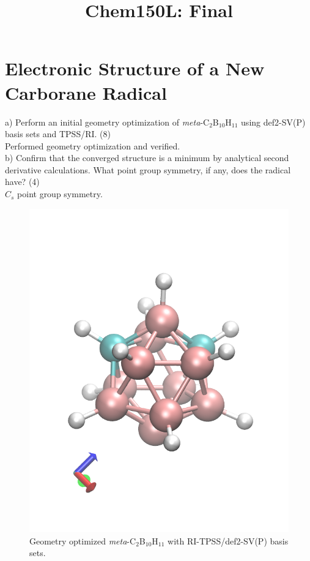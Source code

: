 \documentclass{article}
\title{Chem150L: Final} %
\begin{document}
\maketitle

\section*{Electronic Structure of a New Carborane Radical}

\noindent a) Perform an initial geometry optimization of \textit{meta}-C$_2$B$_{10}$H$_{11}$
using def2-SV(P) basis sets and TPSS/RI. (8)
\\

{\color{blue} Performed geometry optimization and verified.}
\\

\noindent b) Confirm that the converged structure is a minimum by analytical
second derivative calculations. What point group symmetry, if any, does the
radical have? (4)
\\

{\color{blue} $C_s$ point group symmetry.}

\begin{figure}[H]
  \centering
  \includegraphics[scale=0.25]{opt.png}
  \caption{Geometry optimized \textit{meta}-C$_2$B$_{10}$H$_{11}$ with
    RI-TPSS/def2-SV(P) basis sets.}
\end{figure}
\end{document}
